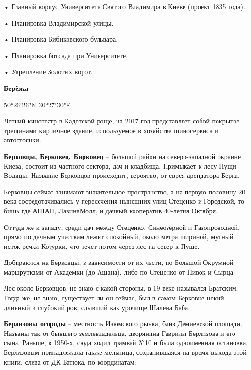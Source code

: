 \noindent • Главный корпус Университета Святого Владимира в Киеве (проект 1835 года).

\noindent • Планировка Владимирской улицы. 

\noindent • Планировка Бибиковского бульвара.

\noindent • Планировка ботсада при Университете.


\noindent • Укрепление Золотых ворот.\\

\medskip



\textbf{Берёзка} 

50°26'26"N 30°27'30"E

Летний кинотеатр в Кадетской роще, на 2017 год представляет собой покрытое трещинами кирпичное здание, используемое в хозяйстве шиносервиса и автостоянки.\\

\medskip


\textbf{Берковцы, Берковец, Бирковец} – большой район на северо-западной окраине Киева, состоит из частного сектора, дач и кладбища. Примыкает к лесу Пущи-Водицы. Название Берковцов происходит, вероятно, от еврея-арендатора Берка.

Берковцы сейчас занимают значительное пространство, а на первую половину 20 века сосредотачивались у пересечения нынешних улиц Стеценко и Городской, то бишь где АШАН, ЛавинаМолл, и дачный кооператив 40-летия Октября. 

Оттуда же к западу, среди дач между Стеценко, Синеозерной и Газопроводной, прямо по дачным участкам лежит спокойный, около метра шириной, мутный исток речки Котурки, что течет потом через лес на север к Пуще.

Добираются на Берковцы, в зависимости от их части, по Большой Окружной маршрутками от Академки (до Ашана), либо по Стеценко от Нивок и Сырца.

Лес около Берковцов, не знаю с какой стороны, в 19 веке назывался Братским. Тогда же, не знаю, существует ли он сейчас, был в самом Берковце некий длинный и глубокий ров, слывший как урочище Шалена Баба.\\

\medskip


\textbf{Берлизовы огороды} – местность Изюмского рынка, близ Демиевской площади. Названы так от бывшего землевладельца, дворянина Гаврилы Берлизова и его сына. Раньше, в 1950-х, сюда ходил трамвай №10 и была одноименная остановка. Берлизовым принадлежала также мельница, сохранившаяся на время выхода этой книги, слева от ДК Батюка, по координатам:

